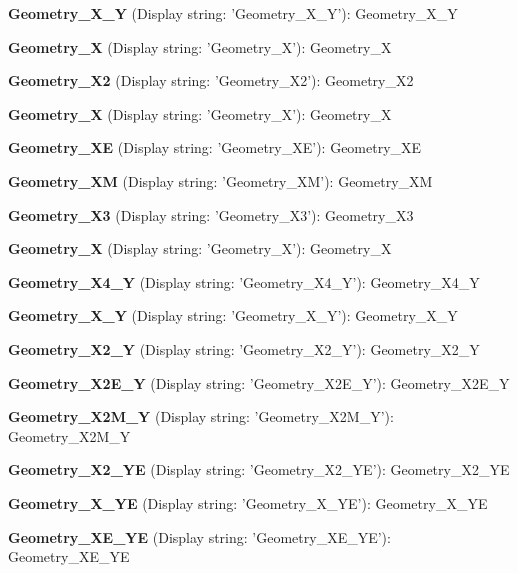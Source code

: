 \begin{DoxyItemize}
\item {\bfseries Geometry\+\_\+X\+\_\+Y} (Display string\+: 'Geometry\+\_\+X\+\_\+Y')\+: Geometry\+\_\+X\+\_\+Y
\item {\bfseries Geometry\+\_\+X} (Display string\+: 'Geometry\+\_\+X')\+: Geometry\+\_\+X
\item {\bfseries Geometry\+\_\+X2} (Display string\+: 'Geometry\+\_\+X2')\+: Geometry\+\_\+X2
\item {\bfseries Geometry\+\_\+X} (Display string\+: 'Geometry\+\_\+X')\+: Geometry\+\_\+X
\item {\bfseries Geometry\+\_\+X\+E} (Display string\+: 'Geometry\+\_\+X\+E')\+: Geometry\+\_\+X\+E
\item {\bfseries Geometry\+\_\+X\+M} (Display string\+: 'Geometry\+\_\+X\+M')\+: Geometry\+\_\+X\+M
\item {\bfseries Geometry\+\_\+X3} (Display string\+: 'Geometry\+\_\+X3')\+: Geometry\+\_\+X3
\item {\bfseries Geometry\+\_\+X} (Display string\+: 'Geometry\+\_\+X')\+: Geometry\+\_\+X
\item {\bfseries Geometry\+\_\+X4\+\_\+Y} (Display string\+: 'Geometry\+\_\+X4\+\_\+Y')\+: Geometry\+\_\+X4\+\_\+Y
\item {\bfseries Geometry\+\_\+X\+\_\+Y} (Display string\+: 'Geometry\+\_\+X\+\_\+Y')\+: Geometry\+\_\+X\+\_\+Y
\item {\bfseries Geometry\+\_\+X2\+\_\+Y} (Display string\+: 'Geometry\+\_\+X2\+\_\+Y')\+: Geometry\+\_\+X2\+\_\+Y
\item {\bfseries Geometry\+\_\+X2\+E\+\_\+Y} (Display string\+: 'Geometry\+\_\+X2\+E\+\_\+Y')\+: Geometry\+\_\+X2\+E\+\_\+Y
\item {\bfseries Geometry\+\_\+X2\+M\+\_\+Y} (Display string\+: 'Geometry\+\_\+X2\+M\+\_\+Y')\+: Geometry\+\_\+X2\+M\+\_\+Y
\item {\bfseries Geometry\+\_\+X2\+\_\+Y\+E} (Display string\+: 'Geometry\+\_\+X2\+\_\+Y\+E')\+: Geometry\+\_\+X2\+\_\+Y\+E
\item {\bfseries Geometry\+\_\+X\+\_\+Y\+E} (Display string\+: 'Geometry\+\_\+X\+\_\+Y\+E')\+: Geometry\+\_\+X\+\_\+Y\+E
\item {\bfseries Geometry\+\_\+X\+E\+\_\+Y\+E} (Display string\+: 'Geometry\+\_\+X\+E\+\_\+Y\+E')\+: Geometry\+\_\+X\+E\+\_\+Y\+E

\end{DoxyItemize}
